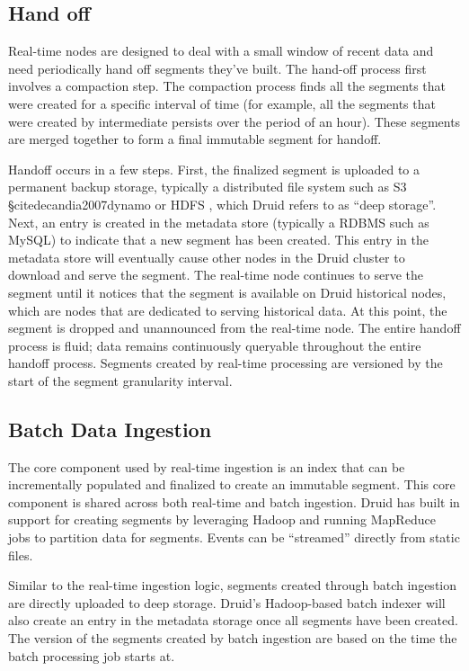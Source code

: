 \documentclass{vldb}
\begin{document}
\subsection{Hand off}
Real-time nodes are designed to deal with a small window of recent data and
need periodically hand off segments they’ve built. The hand-off process first
involves a compaction step. The compaction process finds all the segments that
were created for a specific interval of time (for example, all the segments
that were created by intermediate persists over the period of an hour). These
segments are merged together to form a final immutable segment for handoff. 

Handoff occurs in a few steps. First, the finalized segment is uploaded to a
permanent backup storage, typically a distributed file system such as S3
§cite{decandia2007dynamo} or HDFS \cite{shvachko2010hadoop}, which Druid refers
to as “deep storage”. Next, an entry is created in the metadata store
(typically a RDBMS such as MySQL) to indicate that a new segment has been
created. This entry in the metadata store will eventually cause other nodes in
the Druid cluster to download and serve the segment. The real-time node
continues to serve the segment until it notices that the segment is available
on Druid historical nodes, which are nodes that are dedicated to serving
historical data. At this point, the segment is dropped and unannounced from the
real-time node. The entire handoff process is fluid; data remains continuously
queryable throughout the entire handoff process. Segments created by real-time
processing are versioned by the start of the segment granularity interval.

\subsection{Batch Data Ingestion}
The core component used by real-time ingestion is an index that can be
incrementally populated and finalized to create an immutable segment. This core
component is shared across both real-time and batch ingestion. Druid has built
in support for creating segments by leveraging Hadoop and running MapReduce
jobs to partition data for segments.  Events can be “streamed” directly from
static files.

Similar to the real-time ingestion logic, segments created through batch
ingestion are directly uploaded to deep storage. Druid’s Hadoop-based batch
indexer will also create an entry in the metadata storage once all segments
have been created. The version of the segments created by batch ingestion are
based on the time the batch processing job starts at.
\end{document}
